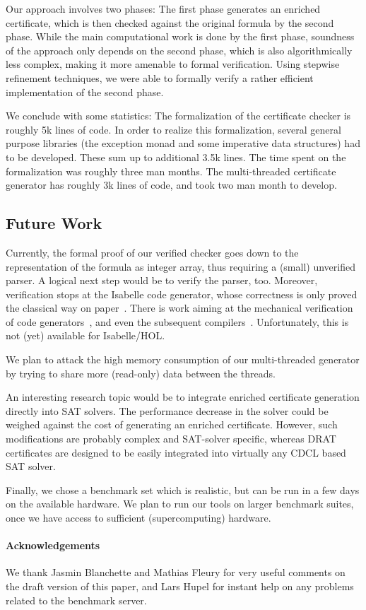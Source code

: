 \documentclass{llncs}
\begin{document}
Our approach involves two phases: The first phase generates an enriched certificate, 
which is then checked against the original formula by the second phase.
While the main computational work is done by the first phase, soundness of the approach 
only depends on the second phase, which is also algorithmically less complex, making it more amenable to formal verification. 
Using stepwise refinement techniques, we were able to formally verify a rather efficient implementation of the second phase.

We conclude with some statistics: The formalization of the certificate checker is roughly 5k lines of code.
In order to realize this formalization, several general purpose libraries (\eg the exception monad and some imperative data structures) had to be developed. 
These sum up to additional 3.5k lines. The time spent on the formalization was roughly three man months. The multi-threaded certificate generator has roughly 3k 
lines of code, and took two man month to develop.

\subsection{Future Work}
Currently, the formal proof of our verified checker goes down to the representation of the formula as integer array,
thus requiring a (small) unverified parser. A logical next step would be to verify the parser, too.
Moreover, verification stops at the Isabelle code generator, whose correctness is only proved the classical way on paper~\cite{HaNi10,HKKN13}. 
There is work aiming at the mechanical verification of code generators~\cite{MO14}, and even the subsequent compilers~\cite{KMNO14}. 
Unfortunately, this is not (yet) available for Isabelle/HOL. 

We plan to attack the high memory consumption of our multi-threaded generator by trying to share more (read-only) data between the threads.

An interesting research topic would be to integrate enriched certificate generation directly into SAT solvers. 
The performance decrease in the solver could be weighed against the cost of generating an enriched certificate.
However, such modifications are probably complex and SAT-solver specific, whereas DRAT certificates are designed to be 
easily integrated into virtually any CDCL based SAT solver.

Finally, we chose a benchmark set which is realistic, but can be run in a few days on the available hardware.
We plan to run our tools on larger benchmark suites, once we have access to sufficient (supercomputing) hardware.

\paragraph{Acknowledgements} We thank Jasmin Blanchette and Mathias Fleury for very useful comments on the draft version of this paper, 
and Lars Hupel for instant help on any problems related to the benchmark server.

\clearpage



\end{document}

